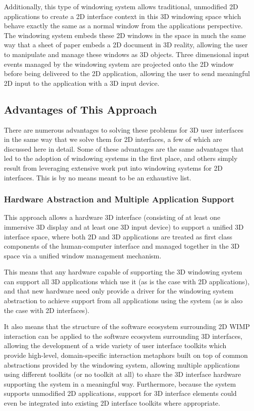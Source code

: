 Additionally, this type of windowing system allows traditional, unmodified 2D applications to create a 2D interface context in this 3D windowing space which behave exactly the same as a normal window from the applications perspective. The windowing system embeds these 2D windows in the space in much the same way that a sheet of paper embeds a 2D document in 3D reality, allowing the user to manipulate and manage these windows as 3D objects. Three dimensional input events managed by the windowing system are projected onto the 2D window before being delivered to the 2D application, allowing the user to send meaningful 2D input to the application with a 3D input device.

\subsection{Advantages of This Approach}

There are numerous advantages to solving these problems for 3D user interfaces in the same way that we solve them for 2D interfaces, a few of which are discussed here in detail. Some of these advantages are the same advantages that led to the adoption of windowing systems in the first place, and others simply result from leveraging extensive work put into windowing systems for 2D interfaces. This is by no means meant to be an exhaustive list.

\subsubsection{Hardware Abstraction and Multiple Application Support}

This approach allows a hardware 3D interface (consisting of at least one immersive 3D display and at least one 3D input device) to support a unified 3D interface space, where both 2D and 3D applications are treated as first class components of the human-computer interface and managed together in the 3D space via a unified window management mechanism. 

This means that any hardware capable of supporting the 3D windowing system can support all 3D applications which use it (as is the case with 2D applications), and that new hardware need only provide a driver for the windowing system abstraction to achieve support from all applications using the system (as is also the case with 2D interfaces). 

It also means that the structure of the software ecosystem surrounding 2D WIMP interaction can be applied to the software ecosystem surrounding 3D interfaces, allowing the development of a wide variety of user interface toolkits which provide high-level, domain-specific interaction metaphors built on top of common abstractions provided by the windowing system, allowing multiple applications using different toolkits (or no toolkit at all) to share the 3D interface hardware supporting the system in a meaningful way. Furthermore, because the system supports unmodified 2D applications, support for 3D interface elements could even be integrated into existing 2D interface toolkits where appropriate.

